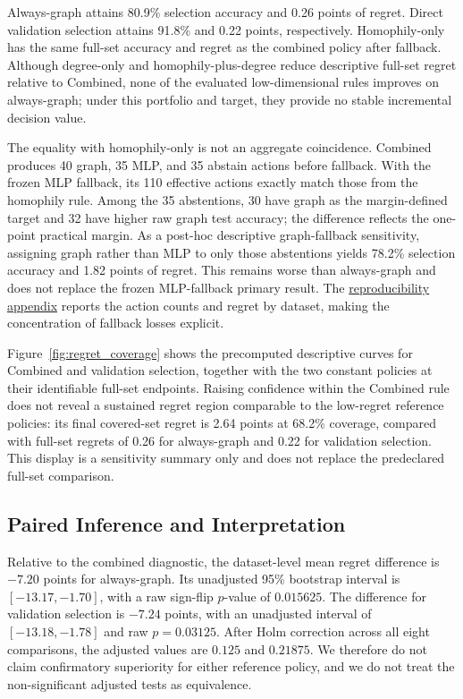 Always-graph attains 80.9\% selection accuracy and 0.26 points of regret. Direct validation selection attains 91.8\% and 0.22 points, respectively. Homophily-only has the same full-set accuracy and regret as the combined policy after fallback. Although degree-only and homophily-plus-degree reduce descriptive full-set regret relative to Combined, none of the evaluated low-dimensional rules improves on always-graph; under this portfolio and target, they provide no stable incremental decision value.

The equality with homophily-only is not an aggregate coincidence. Combined produces 40 graph, 35 MLP, and 35 abstain actions before fallback. With the frozen MLP fallback, its 110 effective actions exactly match those from the homophily rule. Among the 35 abstentions, 30 have graph as the margin-defined target and 32 have higher raw graph test accuracy; the difference reflects the one-point practical margin. As a post-hoc descriptive graph-fallback sensitivity, assigning graph rather than MLP to only those abstentions yields 78.2\% selection accuracy and 1.82 points of regret. This remains worse than always-graph and does not replace the frozen MLP-fallback primary result. The \hyperref[app:reproducibility]{reproducibility appendix} reports the action counts and regret by dataset, making the concentration of fallback losses explicit.

Figure~\ref{fig:regret_coverage} shows the precomputed descriptive curves for Combined and validation selection, together with the two constant policies at their identifiable full-set endpoints. Raising confidence within the Combined rule does not reveal a sustained regret region comparable to the low-regret reference policies: its final covered-set regret is 2.64 points at 68.2\% coverage, compared with full-set regrets of 0.26 for always-graph and 0.22 for validation selection. This display is a sensitivity summary only and does not replace the predeclared full-set comparison.

\subsection{Paired Inference and Interpretation}

Relative to the combined diagnostic, the dataset-level mean regret difference is $-7.20$ points for always-graph. Its unadjusted 95\% bootstrap interval is $[-13.17,-1.70]$, with a raw sign-flip $p$-value of $0.015625$. The difference for validation selection is $-7.24$ points, with an unadjusted interval of $[-13.18,-1.78]$ and raw $p=0.03125$. After Holm correction across all eight comparisons, the adjusted values are $0.125$ and $0.21875$. We therefore do not claim confirmatory superiority for either reference policy, and we do not treat the non-significant adjusted tests as equivalence.

